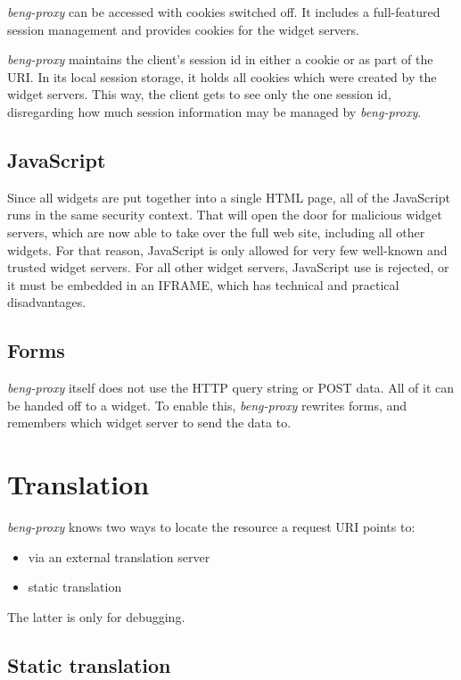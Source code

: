 \documentclass[a4paper,12pt]{article}
\begin{document}
\emph{beng-proxy} can be accessed with cookies switched off.  It includes a
full-featured session management and provides cookies for the widget
servers.

\emph{beng-proxy} maintains the client's session id in either a cookie
or as part of the URI.  In its local session storage, it holds all
cookies which were created by the widget servers.  This way, the
client gets to see only the one session id, disregarding how much
session information may be managed by \emph{beng-proxy}.


\subsection{JavaScript}

Since all widgets are put together into a single HTML page, all of the
JavaScript runs in the same security context.  That will open the door
for malicious widget servers, which are now able to take over the full
web site, including all other widgets.  For that reason, JavaScript is
only allowed for very few well-known and trusted widget servers.  For
all other widget servers, JavaScript use is rejected, or it must be
embedded in an IFRAME, which has technical and practical
disadvantages.


\subsection{Forms}

\emph{beng-proxy} itself does not use the HTTP query string or POST
data.  All of it can be handed off to a widget.  To enable this,
\emph{beng-proxy} rewrites forms, and remembers which widget server to
send the data to.


\section{Translation}

\emph{beng-proxy} knows two ways to locate the resource a request URI
points to:

\begin{itemize}
\item via an external translation server
\item static translation
\end{itemize}

The latter is only for debugging.

\subsection{Static translation}
\end{document}
